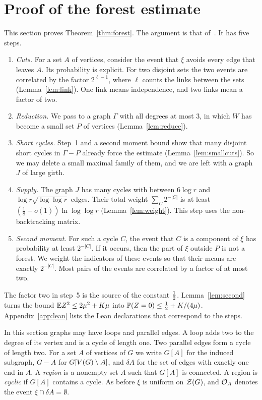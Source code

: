 \section{Proof of the forest estimate}\label{sec:forest}

This section proves Theorem~\ref{thm:forest}. The argument is that of~\cite{KNT}. It has five steps.
\begin{enumerate}
\item \emph{Cuts.} For a set $A$ of vertices, consider the event that $\xi$ avoids every edge that
leaves $A$. Its probability is explicit. For two disjoint sets the two events are correlated by the
factor $2^{\ell-1}$, where $\ell$ counts the links between the sets (Lemma~\ref{lem:link}). One link
means independence, and two links mean a factor of two.
\item \emph{Reduction.} We pass to a graph $\Gamma$ with all degrees at most $3$, in which $W$ has
become a small set $P$ of vertices (Lemma~\ref{lem:reduce}).
\item \emph{Short cycles.} Step~1 and a second moment bound show that many disjoint short cycles in
$\Gamma-P$ already force the estimate (Lemma~\ref{lem:smallcuts}). So we may delete a small maximal
family of them, and we are left with a graph $J$ of large girth.
\item \emph{Supply.} The graph $J$ has many cycles with between $6\log r$ and
$\log r\sqrt{\log\log r}$ edges. Their total weight $\sum_C2^{-|C|}$ is at least
$(\frac18-o(1))\ln\log\log r$ (Lemma~\ref{lem:weight}). This step uses the non-backtracking matrix.
\item \emph{Second moment.} For such a cycle $C$, the event that $C$ is a component of $\xi$ has
probability at least $2^{-|C|}$. If it occurs, then the part of $\xi$ outside $P$ is not a forest.
We weight the indicators of these events so that their means are exactly $2^{-|C|}$. Most pairs of
the events are correlated by a factor of at most two.
\end{enumerate}
The factor two in step~5 is the source of the constant $\tfrac12$. Lemma~\ref{lem:second} turns the
bound $\mathbb{E} Z^{2}\le2\mu^{2}+K\mu$ into $\mathbb{P}(Z=0)\le\tfrac12+K/(4\mu)$. Appendix~\ref{app:lean} lists the
Lean declarations that correspond to the steps.

In this section graphs may have loops and parallel edges. A loop adds two to the degree of its vertex
and is a cycle of length one. Two parallel edges form a cycle of length two. For a set $A$ of
vertices of $G$ we write $G[A]$ for the induced subgraph, $G-A$ for $G[V(G)\setminus A]$, and $\delta A$
for the set of edges with exactly one end in $A$. A \emph{region} is a nonempty set $A$ such that
$G[A]$ is connected. A region is \emph{cyclic} if $G[A]$ contains a cycle. As before $\xi$ is
uniform on $\mathcal{Z}(G)$, and $\mathcal{O}_A$ denotes the event $\xi\cap\delta A=\emptyset$.

